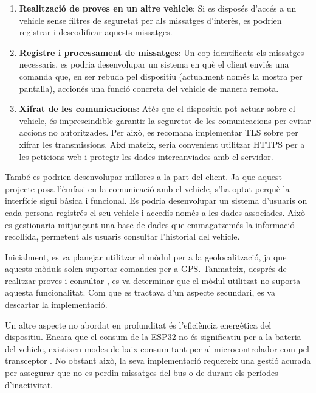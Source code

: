 \documentclass{tfgitic}[2024/07/01]
\begin{document}
\begin{enumerate}
    \item \textbf{Realització de proves en un altre vehicle}: Si es disposés d'accés a un vehicle sense filtres de seguretat per als missatges d'interès, es podrien registrar i descodificar aquests missatges.
    \item \textbf{Registre i processament de missatges}: Un cop identificats els missatges necessaris, es podria desenvolupar un sistema en què el client enviés una comanda  que, en ser rebuda pel dispositiu 
    (actualment només la mostra per pantalla), accionés una funció concreta del vehicle de manera remota.
    \item \textbf{Xifrat de les comunicacions}: Atès que el dispositiu pot actuar sobre el vehicle, és imprescindible garantir la seguretat de les comunicacions per evitar accions no autoritzades. Per això, es recomana 
    implementar TLS sobre  per xifrar les transmissions. Així mateix, seria convenient utilitzar HTTPS per a les peticions web i protegir les dades intercanviades amb el servidor.
\end{enumerate}

També es podrien desenvolupar millores a la part del client. Ja que aquest projecte posa l'èmfasi en la comunicació amb el vehicle, s'ha optat perquè la interfície sigui bàsica i funcional. 
Es podria desenvolupar un sistema d'usuaris on cada persona registrés el seu vehicle i accedís només a les dades associades. Això es gestionaria mitjançant una base de dades que emmagatzemés 
la informació recollida, permetent als usuaris consultar l'historial del vehicle.

Inicialment, es va planejar utilitzar el mòdul  per a la geolocalització, ja que aquests mòduls solen suportar comandes  per a GPS. Tanmateix, després de realitzar proves i consultar \cite{lilygo_t76xx}, 
es va determinar que el mòdul utilitzat no suporta aquesta funcionalitat. Com que es tractava d'un aspecte secundari, es va descartar la implementació.

Un altre aspecte no abordat en profunditat és l'eficiència energètica del dispositiu. Encara que el consum de la ESP32 no és significatiu per a la bateria del vehicle, existixen modes de baix 
consum tant per al microcontrolador com pel transceptor . No obstant això, la seva implementació requereix una gestió acurada per assegurar que no es perdin missatges del bus  o de  
durant els períodes d'inactivitat.

\printbibliography
\end{document}
